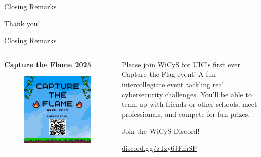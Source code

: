 \documentclass{beamer}
\begin{document}
\begin{frame}{Closing Remarks}
	\begin{center}
		\Huge Thank you!
	\end{center}
\end{frame}

\begin{frame}{Closing Remarks}
	\begin{columns}
		\begin{column}{0.5\textwidth}
			\textbf{Capture the Flame 2025}
			\begin{figure}
				\centering
				\includegraphics[width=0.7\linewidth]{ctf.png}
			\end{figure}
		\end{column}
		\begin{column}{0.5\textwidth}
			Please join WiCyS for UIC's first ever Capture the Flag
			event! A fun intercollegiate event tackling real
			cybersecurity challenges. You'll be able to team up
			with friends or other schools, meet professionals, and
			compete for fun prizes.

			\bigskip
			Join the WiCyS Discord!
			\begin{center}
				\Large \url{discord.gg/zTzy6JFmSF}
			\end{center}
		\end{column}
	\end{columns}
\end{frame}
\end{document}
